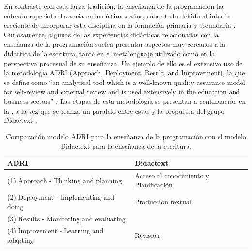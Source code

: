 \documentclass[spanish]{textolivre}
\begin{document}
En contraste con esta larga tradición, la enseñanza de la programación ha cobrado especial relevancia en los últimos años, sobre todo debido al interés creciente de incorporar esta disciplina en la formación primaria y secundaria \cite{dapozo2016capacitacion, torrent2019programacion}. Curiosamente, algunas de las experiencias didácticas relacionadas con la enseñanza de la programación suelen presentar aspectos muy cercanos a la didáctica de la escritura, tanto en el metalenguaje utilizado como en la perspectiva procesual de su enseñanza. Un ejemplo de ello es el extensivo uso de la metodología ADRI (Approach, Deployment, Result, and Improvement), la que se define como “an analytical tool which is a well-known quality assurance model for self-review and external review and is used extensively in the education and business sectors” \cite[p.1096]{malik2017model}. Las etapas de esta metodología se presentan a continuación en la , a la vez que se realiza un paralelo entre estas y la propuesta del grupo Didactext \cite{didactext2003modelo}.

\begin{table}[htpb]
\centering
\begin{threeparttable}
\caption{Comparación modelo ADRI para la enseñanza de la programación con el modelo Didactext para la enseñanza de la escritura.}
\label{tabla-modelos}
\begin{tabular}{ll}
\toprule 
ADRI & Didactext \\ 
\midrule
(1) Approach - Thinking and planning & Acceso al conocimiento y Planificación\\
(2) Deployment - Implementing and doing & Producción textual\\
(3) Results - Monitoring and evaluating & \\
(4) Improvement - Learning and adapting & Revisión\\
\bottomrule
\end{tabular}
\end{threeparttable}
\end{table}
\end{document}
